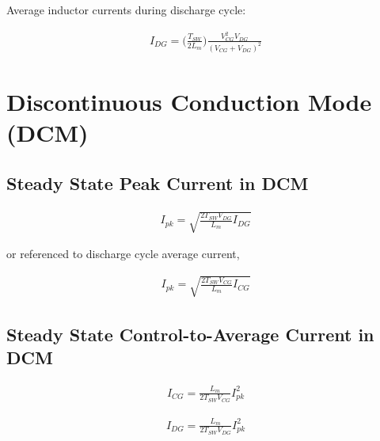 \documentclass{scrartcl}
\begin{document}
		   Average inductor currents during discharge cycle:

			\begin{align}
			I_{DG} = \bigg(\frac{T_{SW}}{2L_m}\bigg)\frac{V_{CG}^2 V_{DG}}{(V_{CG} + V_{DG})^2} 
			\end{align}		

	\section{Discontinuous Conduction Mode (DCM)}
	
		\subsection{Steady State Peak Current in DCM}
		
		\begin{align}
		I_{pk} = \sqrt{\frac{2T_{SW}V_{DG}}{L_m}I_{DG}}
		\end{align}	
		
		or referenced to discharge cycle average current,
	
		\begin{align}
		I_{pk} = \sqrt{\frac{2T_{SW}V_{CG}}{L_m}I_{CG}}
		\end{align}	
		
		\subsection{Steady State Control-to-Average Current in DCM}

		\begin{align}
		I_{CG} = \frac{L_m}{2T_{SW}V_{CG}}I_{pk}^2
		\end{align}	

		\begin{align}
	I_{DG} = \frac{L_m}{2T_{SW}V_{DG}}I_{pk}^2
	\end{align}	
	
\end{document}
